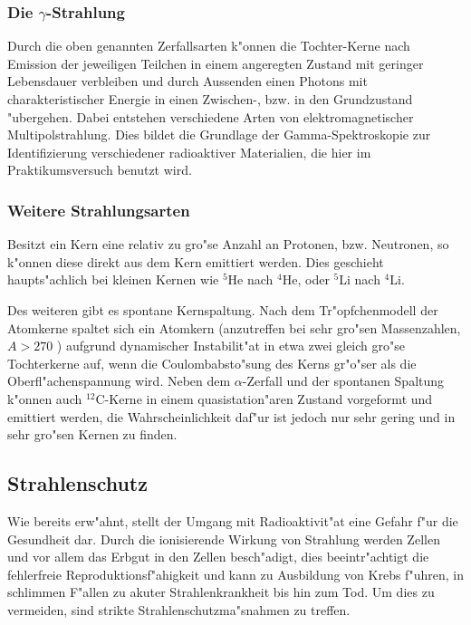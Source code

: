 \documentclass[12pt]{article}
\begin{document}
\subsubsection{Die $\gamma$-Strahlung}
Durch die oben genannten Zerfallsarten k"onnen die Tochter-Kerne nach Emission der jeweiligen Teilchen in einem angeregten Zustand mit geringer Lebensdauer verbleiben und durch Aussenden einen Photons mit charakteristischer Energie in einen Zwischen-, bzw. in den Grundzustand "ubergehen. Dabei entstehen verschiedene Arten von elektromagnetischer Multipolstrahlung. Dies bildet die Grundlage der Gamma-Spektroskopie zur Identifizierung verschiedener radioaktiver Materialien, die hier im Praktikumsversuch benutzt wird. 

\subsubsection{Weitere Strahlungsarten}
Besitzt ein Kern eine relativ zu gro"se Anzahl an Protonen, bzw. Neutronen, so k"onnen diese direkt aus dem Kern emittiert werden. Dies geschieht haupts"achlich bei kleinen Kernen wie $^{5}$He nach $^{4}$He, oder $^{5}$Li nach $^{4}$Li. \par 
Des weiteren gibt es spontane Kernspaltung. Nach dem Tr"opfchenmodell der Atomkerne spaltet sich ein Atomkern (anzutreffen bei sehr gro"sen Massenzahlen, $A>270$ \cite{povh}) aufgrund dynamischer Instabilit"at in etwa zwei gleich gro"se Tochterkerne auf, wenn die Coulombabsto"sung des Kerns gr"o"ser als die Oberfl"achenspannung wird. 
Neben dem $\alpha$-Zerfall und der spontanen Spaltung k"onnen auch $^{12}$C-Kerne in einem quasistation"aren Zustand vorgeformt und emittiert werden, die Wahrscheinlichkeit daf"ur ist jedoch nur sehr gering und in sehr gro"sen Kernen zu finden.  

\subsection{Strahlenschutz}

Wie bereits erw"ahnt, stellt der Umgang mit Radioaktivit"at eine Gefahr f"ur die Gesundheit dar. Durch die ionisierende Wirkung von Strahlung werden Zellen und vor allem das Erbgut in den Zellen besch"adigt, dies beeintr"achtigt die fehlerfreie Reproduktionsf"ahigkeit und kann zu Ausbildung von Krebs f"uhren, in schlimmen F"allen zu akuter Strahlenkrankheit bis hin zum Tod. Um dies zu vermeiden, sind strikte Strahlenschutzma"snahmen zu treffen. 
\end{document}
